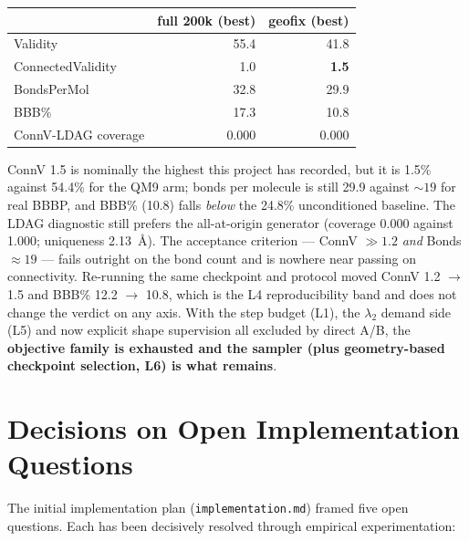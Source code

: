 \documentclass[12pt, a4paper]{article}
\begin{document}
\begin{center}
\begin{tabular}{lrr}
\toprule
 & full 200k (best) & geofix (best) \\
\midrule
Validity             & 55.4 & 41.8 \\
ConnectedValidity    & 1.0  & \textbf{1.5} \\
BondsPerMol          & 32.8 & 29.9 \\
BBB\%                & 17.3 & 10.8 \\
ConnV-LDAG coverage  & 0.000 & 0.000 \\
\bottomrule
\end{tabular}
\end{center}

ConnV 1.5 is nominally the highest this project has recorded, but it is 1.5\%
against 54.4\% for the QM9 arm; bonds per molecule is still 29.9 against
${\sim}19$ for real BBBP, and BBB\% (10.8) falls \emph{below} the 24.8\%
unconditioned baseline. The LDAG diagnostic still prefers the all-at-origin
generator (coverage 0.000 against 1.000; uniqueness 2.13~\AA{}). The
acceptance criterion --- ConnV $\gg 1.2$ \emph{and} Bonds $\approx 19$ ---
fails outright on the bond count and is nowhere near passing on connectivity.
Re-running the same checkpoint and protocol moved ConnV 1.2 $\to$ 1.5 and BBB\%
12.2 $\to$ 10.8, which is the L4 reproducibility band and does not change the
verdict on any axis. With the step budget (L1), the $\lambda_2$ demand side
(L5) and now explicit shape supervision all excluded by direct A/B, the
\textbf{objective family is exhausted and the sampler (plus geometry-based
checkpoint selection, L6) is what remains}.

\section{Decisions on Open Implementation Questions}
\label{sec:openq}

The initial implementation plan (\texttt{implementation.md}) framed five open questions. Each has been decisively resolved through empirical experimentation:
\end{document}
